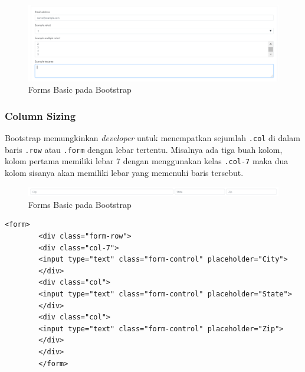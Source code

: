 \documentclass[a4paper,twoside]{article}
\begin{document}
\begin{enumerate}
		\begin{figure} [H]
			\centering  
			\includegraphics[scale=0.7]{formsbasic_bootstrap.png}  
			\caption{Forms Basic pada Bootstrap} 
		\end{figure} 
		\subsubsection{Column Sizing}
		Bootstrap memungkinkan \textit{developer} untuk menempatkan sejumlah \texttt{.col} di dalam baris \texttt{.row} atau \texttt{.form} dengan lebar tertentu. Misalnya ada tiga buah kolom, kolom pertama memiliki lebar 7 dengan menggunakan kelas \texttt{.col-7} maka dua kolom sisanya akan memiliki lebar yang  memenuhi baris tersebut.
		\begin{figure} [H]
			\centering  
			\includegraphics[scale=0.7]{columnsizing_bootstrap.png}  
			\caption{Forms Basic pada Bootstrap} 
		\end{figure} 
		\begin{lstlisting}[frame=single] 
		<form>
		<div class="form-row">
		<div class="col-7">
		<input type="text" class="form-control" placeholder="City">
		</div>
		<div class="col">
		<input type="text" class="form-control" placeholder="State">
		</div>
		<div class="col">
		<input type="text" class="form-control" placeholder="Zip">
		</div>
		</div>
		</form>
		\end{lstlisting}

\end{enumerate}
\end{document}
